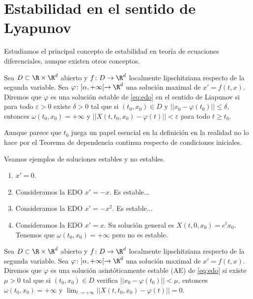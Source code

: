 

\newpage

\section{Estabilidad en el sentido de Lyapunov}

Estudiamos el principal concepto de estabilidad en teoría de ecuaciones diferenciales, aunque
existen otros conceptos.


\begin{definition}
  Sea $D \subset \R \times \R^d$ abierto y $f \colon D \to \R^d$ localmente lipschitziana respecto
  de la segunda variable. Sea $\varphi\colon ]\alpha, +\infty[ \to \R^d$ una solución maximal de
  $x' = f(t,x)$. Diremos que $\varphi$ es una solución estable de \eqref{eq:edo} en el sentido de
  Liapunov si para todo $\varepsilon >0$ existe $\delta > 0$ tal que si $(t_0, x_0) \in D$ y
  $||x_0-\varphi(t_0)|| \le \delta$, entonces $\omega(t_0, x_0) = +\infty$ y
  $||X(t, t_0, x_0) - \varphi(t)|| < \varepsilon$ para todo $t \ge t_0$.
\end{definition}

\begin{remark}
  Aunque parece que $t_0$ juega un papel esencial en la definición en la realidad no lo hace por el
  Teorema de dependencia continua respecto de condiciones iniciales.
\end{remark}

\begin{ex}
  Veamos ejemplos de soluciones estables y no estables.
  \begin{enumerate}
  \item $x' = 0$.
  \item Consideramos la EDO $x' = -x$. Es estable...
  \item Consideramos la EDO $x' = -x^2$. Es estable...
  \item Consideramos la EDO $x' = x$. Su solución general es $X(t,0,x_0) = e^t x_0$. Tenemos que
    $\omega(t_0, x_0) = +\infty$ pero no es estable.
  \end{enumerate}
\end{ex}

\begin{definition}
  Sea $D \subset \R \times \R^d$ abierto y $f \colon D \to \R^d$ localmente lipschitziana respecto
  de la segunda variable. Sea $\varphi\colon ]\alpha, +\infty[ \to \R^d$ una solución maximal de
  $x' = f(t,x)$. Diremos que $\varphi$ es una solución asintóticamente estable (AE) de
  \eqref{eq:edo} si existe $\mu > 0$ tal que si $(t_0, x_0) \in D$ verifica
  $||x_0 - \varphi(t_0)|| < \mu$, entonces $\omega(t_0, x_0) = +\infty$ y
  $\lim_{t \to +\infty} ||X(t, t_0, x_0) - \varphi(t)|| = 0$.
\end{definition}

